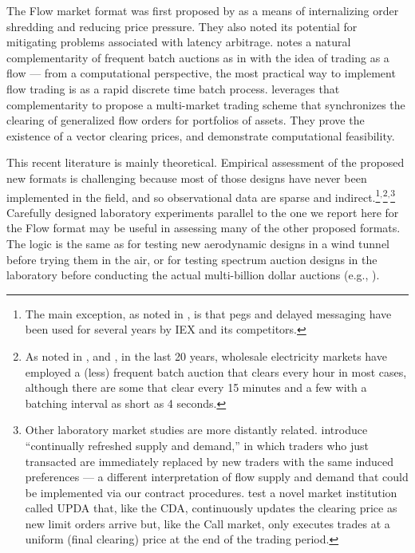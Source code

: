 \documentclass[12pt]{article}
\begin{document}
The Flow market format was first proposed by  \cite{Kyle2017} as a means of internalizing order shredding and reducing price pressure. They also noted its potential for mitigating problems associated with latency arbitrage.
\cite{Budish2023} notes a natural 
complementarity of frequent batch auctions as in 
\cite{Budish2015} with the idea of trading as a flow 
 --- from a computational perspective, the most practical way to implement flow trading is as a rapid discrete time batch process.   
\cite{Budish2023} leverages that complementarity to propose a multi-market trading scheme that synchronizes the clearing of generalized flow orders for portfolios of assets.  
They prove the existence of a vector clearing prices, and demonstrate computational feasibility.

This recent literature is mainly theoretical. 
Empirical assessment of the proposed new formats is challenging because most of those designs have never been implemented in the field, and so observational data are sparse and indirect.\footnote{
The main exception, as noted in \cite{Aldrich2022}, is that pegs and delayed messaging have been used for several years by IEX and its competitors.}$^,$\footnote{As noted in \cite{cramton2017electricity}, and \cite{cramton2024forward}, 
in the last 20 years, wholesale electricity markets have employed a (less) frequent batch auction that clears every hour in most cases, although there are some that clear every 15 minutes and a few with a batching interval as short as 4 
seconds.}$^,$\footnote{Other laboratory market studies are more distantly related. \cite{brewer2002behavioral} 
introduce ``continually refreshed supply and demand,'' in which traders who just transacted are immediately replaced by new traders with the same induced preferences --- a different interpretation of flow supply and demand that could be implemented via our contract procedures. 
\cite{mccabe1993designing} test a novel market institution called UPDA that, like the CDA, continuously updates the clearing price as new limit orders arrive but, like the Call market, only executes trades at a uniform (final clearing) price at the end of the trading period.}
Carefully designed laboratory experiments parallel to the one we report here for the Flow format may be useful in assessing many of the other proposed formats.
The logic is the same as for testing new aerodynamic designs in a wind tunnel before trying them in the air, or for testing spectrum auction designs in the laboratory before conducting the actual multi-billion dollar auctions (e.g., \cite{Binmore2002}).
\end{document}
